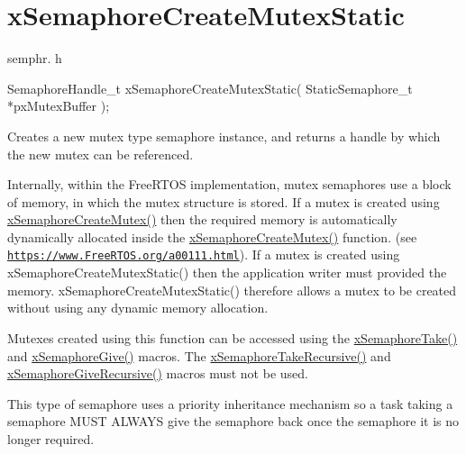 \hypertarget{group__x_semaphore_create_mutex_static}{}\section{x\+Semaphore\+Create\+Mutex\+Static}
\label{group__x_semaphore_create_mutex_static}
semphr. h 
\begin{DoxyPre}
SemaphoreHandle\_t xSemaphoreCreateMutexStatic( StaticSemaphore\_t *pxMutexBuffer );
\end{DoxyPre}


Creates a new mutex type semaphore instance, and returns a handle by which the new mutex can be referenced.

Internally, within the Free\+R\+T\+OS implementation, mutex semaphores use a block of memory, in which the mutex structure is stored. If a mutex is created using \hyperlink{vendor_2ceedling_2plugins_2freertos_2src_2freertos_2include_2semphr_8h_aa6a00aa9b91a9e5b3ebe4ae1c3f115c6}{x\+Semaphore\+Create\+Mutex()} then the required memory is automatically dynamically allocated inside the \hyperlink{vendor_2ceedling_2plugins_2freertos_2src_2freertos_2include_2semphr_8h_aa6a00aa9b91a9e5b3ebe4ae1c3f115c6}{x\+Semaphore\+Create\+Mutex()} function. (see \href{https://www.FreeRTOS.org/a00111.html}{\tt https\+://www.\+Free\+R\+T\+O\+S.\+org/a00111.\+html}). If a mutex is created using x\+Semaphore\+Create\+Mutex\+Static() then the application writer must provided the memory. x\+Semaphore\+Create\+Mutex\+Static() therefore allows a mutex to be created without using any dynamic memory allocation.

Mutexes created using this function can be accessed using the \hyperlink{externals_2freertos_2include_2semphr_8h_af116e436d2a5ae5bd72dbade2b5ea930}{x\+Semaphore\+Take()} and \hyperlink{externals_2freertos_2include_2semphr_8h_aae55761cabfa9bf85c8f4430f78c0953}{x\+Semaphore\+Give()} macros. The \hyperlink{vendor_2ceedling_2plugins_2freertos_2src_2freertos_2include_2semphr_8h_ad395f4bba51eea6af3397d72bc079e4d}{x\+Semaphore\+Take\+Recursive()} and \hyperlink{vendor_2ceedling_2plugins_2freertos_2src_2freertos_2include_2semphr_8h_a398d66b17856c22dd49d39aaac42f105}{x\+Semaphore\+Give\+Recursive()} macros must not be used.

This type of semaphore uses a priority inheritance mechanism so a task \textquotesingle{}taking\textquotesingle{} a semaphore M\+U\+ST A\+L\+W\+A\+YS \textquotesingle{}give\textquotesingle{} the semaphore back once the semaphore it is no longer required.

